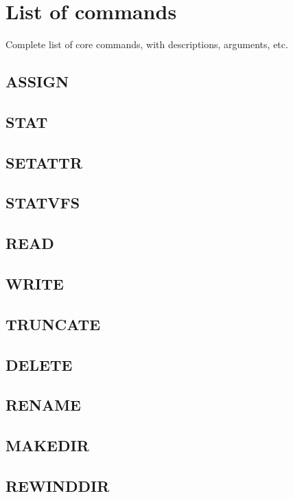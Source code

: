 
\section{List of commands}

Complete list of core commands, with descriptions, arguments, etc.

\subsection{ASSIGN}

\subsection{STAT}

\subsection{SETATTR}

\subsection{STATVFS}

\subsection{READ}

\subsection{WRITE}

\subsection{TRUNCATE}

\subsection{DELETE}

\subsection{RENAME}

\subsection{MAKEDIR}

\subsection{REWINDDIR}

